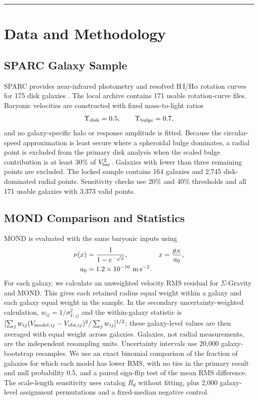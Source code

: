 \documentclass[aps,prd,reprint,superscriptaddress,showpacs,floatfix,longbibliography]{revtex4-2}
\begin{document}
\medskip\hrule\medskip

\section{Data and Methodology}

\subsection{SPARC Galaxy Sample}

SPARC provides near-infrared photometry and resolved H\,I/H$\alpha$ rotation curves for 175 disk galaxies \cite{ref7}. The local archive contains 171 usable rotation-curve files. Baryonic velocities are constructed with fixed mass-to-light ratios
\begin{equation}
\Upsilon_{\rm disk}=0.5,\qquad
\Upsilon_{\rm bulge}=0.7,
\label{eq:ml}
\end{equation}
and no galaxy-specific halo or response amplitude is fitted. Because the circular-speed approximation is least secure where a spheroidal bulge dominates, a radial point is excluded from the primary disk analysis when the scaled bulge contribution is at least 30\% of $V_{\rm bar}^2$. Galaxies with fewer than three remaining points are excluded. The locked sample contains 164 galaxies and 2,745 disk-dominated radial points. Sensitivity checks use 20\% and 40\% thresholds and all 171 usable galaxies with 3,373 valid points.

\subsection{MOND Comparison and Statistics}

MOND is evaluated with the same baryonic inputs using
\begin{equation}
\begin{aligned}
\nu(x)&=\frac{1}{1-e^{-\sqrt{x}}},&
x&=\frac{g_N}{a_0},\\
a_0&=1.2\times10^{-10}\ {\rm m\,s^{-2}}.&&
\end{aligned}
\label{eq:mond}
\end{equation}
For each galaxy, we calculate an unweighted velocity RMS residual for $\Sigma$-Gravity and MOND. This gives each retained radius equal weight within a galaxy and each galaxy equal weight in the sample. In the secondary uncertainty-weighted calculation, $w_{ij}=1/\sigma_{V,ij}^2$ and the within-galaxy statistic is $[\sum_jw_{ij}(V_{{\rm model},ij}-V_{{\rm obs},ij})^2/\sum_jw_{ij}]^{1/2}$; these galaxy-level values are then averaged with equal weight across galaxies. Galaxies, not radial measurements, are the independent resampling units. Uncertainty intervals use 20,000 galaxy-bootstrap resamples. We use an exact binomial comparison of the fraction of galaxies for which each model has lower RMS, with no ties in the primary result and null probability 0.5, and a paired sign-flip test of the mean RMS difference. The scale-length sensitivity uses catalog $R_d$ without fitting, plus 2,000 galaxy-level assignment permutations and a fixed-median negative control.
\end{document}
